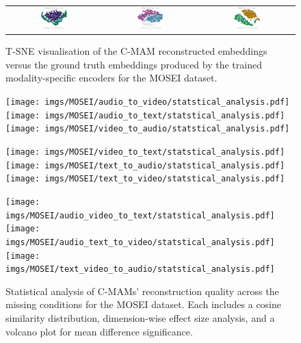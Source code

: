 \begin{figure}[hb!]
\begin{tabular}{ccc}
      \includegraphics[width=0.33\textwidth]{imgs/MOSEI/audio_video_to_text/plots/tsne_embeddings_with_reconstructions.png} & 
      \includegraphics[width=0.33\textwidth]{imgs/MOSEI/audio_text_to_video/plots/tsne_embeddings_with_reconstructions.png}  & 
      \includegraphics[width=0.33\textwidth]{imgs/MOSEI/text_video_to_audio/plots/tsne_embeddings_with_reconstructions.png} \\ 
      
    \end{tabular}
    \caption{T-SNE visualisation of the C-MAM reconstructed embeddings versus the ground truth embeddings produced by the trained modality-specific encoders for the MOSEI dataset.}
  \end{figure}


  \begin{figure}[ht!]
    \centering
    \texttt{[image: imgs/MOSEI/audio\_to\_video/statstical\_analysis.pdf]}
    \texttt{[image: imgs/MOSEI/audio\_to\_text/statstical\_analysis.pdf]}
    \texttt{[image: imgs/MOSEI/video\_to\_audio/statstical\_analysis.pdf]}
    \end{figure}
  \begin{figure}[ht!]
    \ContinuedFloat
    \texttt{[image: imgs/MOSEI/video\_to\_text/statstical\_analysis.pdf]}
    \texttt{[image: imgs/MOSEI/text\_to\_audio/statstical\_analysis.pdf]}
    \texttt{[image: imgs/MOSEI/text\_to\_video/statstical\_analysis.pdf]}
  \end{figure}
    \begin{figure}[ht!]
    \ContinuedFloat
    \texttt{[image: imgs/MOSEI/audio\_video\_to\_text/statstical\_analysis.pdf]}
    \texttt{[image: imgs/MOSEI/audio\_text\_to\_video/statstical\_analysis.pdf]}
    \texttt{[image: imgs/MOSEI/text\_video\_to\_audio/statstical\_analysis.pdf]}
    \caption{Statistical analysis of C-MAMs' reconstruction quality across the missing conditions for the MOSEI dataset. Each includes a cosine similarity distribution, dimension-wise effect size analysis, and a volcano plot for mean difference significance.}
\end{figure}

